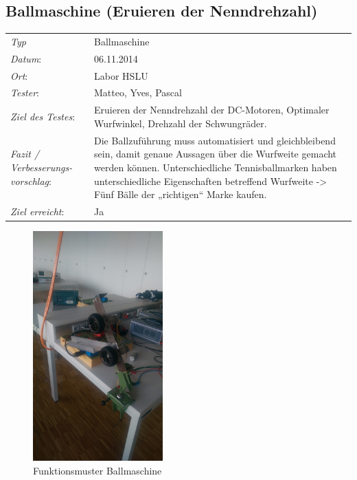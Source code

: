 \subsection{Ballmaschine (Eruieren der Nenndrehzahl)}

\begin{tabular}{p{3.6cm}p{9.4cm}}
\textit{Typ}              & Ballmaschine \\ 
\textit{Datum}:           & 06.11.2014   \\
\textit{Ort}:             & Labor HSLU \\
\textit{Tester}:          & Matteo, Yves, Pascal\\
\textit{Ziel des Testes}: & Eruieren der Nenndrehzahl der DC-Motoren, Optimaler Wurfwinkel, Drehzahl der Schwungräder.  \\
\textit{Fazit / Verbesserungs-\newline vorschlag}: & Die Ballzuführung muss automatisiert und gleichbleibend sein, damit genaue Aussagen über die Wurfweite gemacht werden können. 
Unterschiedliche Tennisballmarken haben unterschiedliche Eigenschaften betreffend Wurfweite -> Fünf Bälle der „richtigen“ Marke kaufen. \\
\textit{Ziel erreicht}:& Ja\\
\end{tabular}
\begin{figure}[h!]
	\includegraphics[width=5cm]{Funktionstests/Bilder/Ballmaschine_Drehzahl1.jpg}
	\centering
	\caption{Funktionsmuster Ballmaschine} 
\label{abb:Ballmaschine_Drehzahl}
\end{figure}